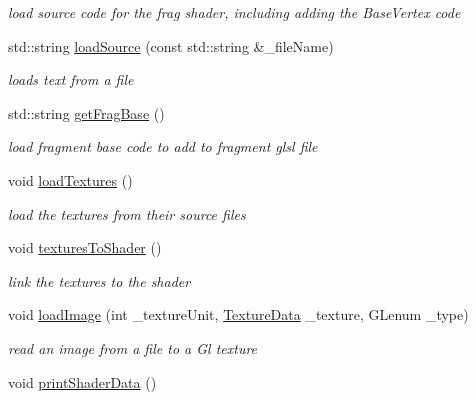\begin{DoxyCompactItemize}
\begin{DoxyCompactList}\small\item\em load source code for the frag shader, including adding the Base\-Vertex code \end{DoxyCompactList}\item 
std\-::string \hyperlink{struct_shader_pro_a07d7c40d47452a9b5b108854398a27bc}{load\-Source} (const std\-::string \&\-\_\-file\-Name)
\begin{DoxyCompactList}\small\item\em loads text from a file \end{DoxyCompactList}\item 
std\-::string \hyperlink{struct_shader_pro_a2597c8fede9842fad4b0e14db042ef91}{get\-Frag\-Base} ()
\begin{DoxyCompactList}\small\item\em load fragment base code to add to fragment glsl file \end{DoxyCompactList}\item 
\hypertarget{struct_shader_pro_a20ab79316be828c3d08f5016739e48a5}{void \hyperlink{struct_shader_pro_a20ab79316be828c3d08f5016739e48a5}{load\-Textures} ()}\label{struct_shader_pro_a20ab79316be828c3d08f5016739e48a5}

\begin{DoxyCompactList}\small\item\em load the textures from their source files \end{DoxyCompactList}\item 
\hypertarget{struct_shader_pro_ad54d2cce5d4fac7089610de3602fc2af}{void \hyperlink{struct_shader_pro_ad54d2cce5d4fac7089610de3602fc2af}{textures\-To\-Shader} ()}\label{struct_shader_pro_ad54d2cce5d4fac7089610de3602fc2af}

\begin{DoxyCompactList}\small\item\em link the textures to the shader \end{DoxyCompactList}\item 
void \hyperlink{struct_shader_pro_a641844c63583b896ecc5822a17eef21b}{load\-Image} (int \-\_\-texture\-Unit, \hyperlink{struct_texture_data}{Texture\-Data} \-\_\-texture, G\-Lenum \-\_\-type)
\begin{DoxyCompactList}\small\item\em read an image from a file to a Gl texture \end{DoxyCompactList}\item 
\hypertarget{struct_shader_pro_a2d111c2168ed1c32f622a14f7d8dceaf}{void \hyperlink{struct_shader_pro_a2d111c2168ed1c32f622a14f7d8dceaf}{print\-Shader\-Data} ()}\label{struct_shader_pro_a2d111c2168ed1c32f622a14f7d8dceaf}


\end{DoxyCompactItemize}
